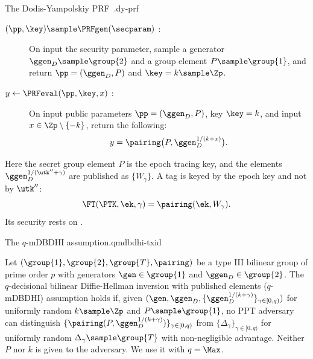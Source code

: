 \begin{primitivebox}{The Dodis-Yampolskiy PRF~\cite{PKC:DodYam05}.}{dy-prf}

  \begin{description}

    \item[$(\pp,\key) \sample \PRFgen(\secparam)$ :] On input the security
parameter, sample a generator $\ggen_D \sample \group{2}$ and a group element $P
\sample \group{1}$, and return $\pp = (\ggen_D, P)$ and $\key = k \sample \Zp$.

    \item[$y \leftarrow \PRFeval(\pp, \key, x)$ :] On input public parameters
$\pp = (\ggen_D, P)$, key $\key = k$, and input $x \in \Zp \setminus \{-k\}$,
return the following:
      \begin{equation*}
	y = \pairing\big(P, \ggen_D^{1/(k+x)}\big).
      \end{equation*}

  \end{description}

\end{primitivebox}

Here the secret group element $P$ is the epoch tracing key, and the elements
$\ggen_D^{1/(\utk''+\gamma)}$ are published as $\{W_\gamma\}$. A tag is
keyed by the epoch key and not by $\utk''$:
%
\begin{equation*}
  \FT(\PTK,\ek,\gamma) = \pairing(\ek, W_\gamma).
\end{equation*}
%
Its security rests on .

\begin{assumptionbox}{The $q$-mDBDHI assumption.}{qmdbdhi-txid}

  Let $(\group{1},\group{2},\group{T},\pairing)$ be a type III bilinear group of
prime order $p$ with generators $\gen \in \group{1}$ and $\ggen_D \in
\group{2}$. The $q$-decisional bilinear Diffie-Hellman inversion with published
elements ($q$-mDBDHI) assumption holds if, given $(\gen, \ggen_D,
\{\ggen_D^{1/(k+\gamma)}\}_{\gamma\in[0,q)})$ for uniformly random $k \sample
\Zp$ and $P \sample \group{1}$, no PPT adversary can distinguish
$\{\pairing(P, \ggen_D^{1/(k+\gamma)})\}_{\gamma\in[0,q)}$ from
$\{\Delta_{\gamma}\}_{\gamma \in [0,q)}$ for uniformly random $\Delta_{\gamma}
\sample \group{T}$ with non-negligible advantage. Neither $P$ nor $k$ is given
to the adversary. We use it with $q = \Max$.

\end{assumptionbox}

